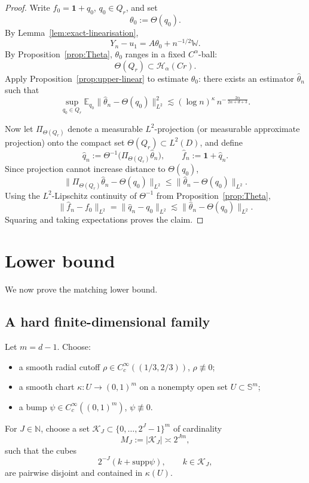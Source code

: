 \documentclass[11pt]{article}
\newcommand{\E}{\mathbb E}
\newcommand{\one}{\mathbf 1}
\newcommand{\supp}{\mathrm{supp}}
\begin{document}
\begin{proof}
Write $f_0=\one+q_0$, $q_0\in Q_r$, and set
\[
\theta_0:=\Theta(q_0).
\]
By Lemma~\ref{lem:exact-linearisation},
\[
Y_n-u_1=A\theta_0+n^{-1/2}\mathbb W.
\]
By Proposition~\ref{prop:Theta}, $\theta_0$ ranges in a fixed $C^\alpha$-ball:
\[
\Theta(Q_r)\subset \mathcal H_\alpha(Cr).
\]
Apply Proposition~\ref{prop:upper-linear} to estimate $\theta_0$:
there exists an estimator $\hat\theta_n$ such that
\[
\sup_{q_0\in Q_r}
\E_{q_0}\|\hat\theta_n-\Theta(q_0)\|_{L^2}^2
\lesssim
(\log n)^\kappa\, n^{-\,\frac{2\alpha}{2\alpha+d+3}}.
\]

Now let $\Pi_{\Theta(Q_r)}$ denote a measurable $L^2$-projection (or measurable approximate projection) onto the compact set $\Theta(Q_r)\subset L^2(D)$, and define
\[
\hat q_n:=\Theta^{-1}\bigl(\Pi_{\Theta(Q_r)}\hat\theta_n\bigr),
\qquad
\hat f_n:=\one+\hat q_n.
\]
Since projection cannot increase distance to $\Theta(q_0)$,
\[
\|\Pi_{\Theta(Q_r)}\hat\theta_n-\Theta(q_0)\|_{L^2}
\le
\|\hat\theta_n-\Theta(q_0)\|_{L^2}.
\]
Using the $L^2$-Lipschitz continuity of $\Theta^{-1}$ from Proposition~\ref{prop:Theta},
\[
\|\hat f_n-f_0\|_{L^2}
=
\|\hat q_n-q_0\|_{L^2}
\lesssim
\|\hat\theta_n-\Theta(q_0)\|_{L^2}.
\]
Squaring and taking expectations proves the claim.
\end{proof}

\section{Lower bound}

We now prove the matching lower bound.

\subsection*{A hard finite-dimensional family}

Let $m=d-1$. Choose:
\begin{itemize}
\item a smooth radial cutoff $\rho\in C_c^\infty((1/3,2/3))$, $\rho\not\equiv 0$;
\item a smooth chart $\kappa:U\to (0,1)^m$ on a nonempty open set $U\subset \mathbb S^{m}$;
\item a bump $\psi\in C_c^\infty((0,1)^m)$, $\psi\not\equiv 0$.
\end{itemize}

For $J\in\mathbb N$, choose a set $\mathcal K_J\subset \{0,\dots,2^J-1\}^m$ of cardinality
\[
M_J:=|\mathcal K_J|\asymp 2^{Jm},
\]
such that the cubes
\[
2^{-J}(k+\supp\psi),\qquad k\in \mathcal K_J,
\]
are pairwise disjoint and contained in $\kappa(U)$.
\end{document}
